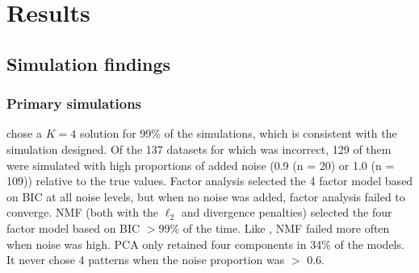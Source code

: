 \section{Results}
\label{results}
\subsection{Simulation findings}
\label{results_sim}
\subsubsection{Primary simulations}
\bnmf chose a $K = 4$ solution for 99\% of the simulations, which is consistent with the simulation designed. Of the 137 datasets for which \bnmf was incorrect, 129 of them were simulated with high proportions of added noise (0.9 (n = 20) or 1.0 (n = 109)) relative to the true values. Factor analysis selected the 4 factor model based on BIC at all noise levels, but when no noise was added, factor analysis failed to converge. NMF (both with the $\ell_2$ and divergence penalties) selected the four factor model based on BIC $>$99\% of the time. Like \bnmf, NMF failed more often when noise was high. PCA only retained four components in 34\% of the models. It never chose 4 patterns when the noise proportion was $>$ 0.6.

